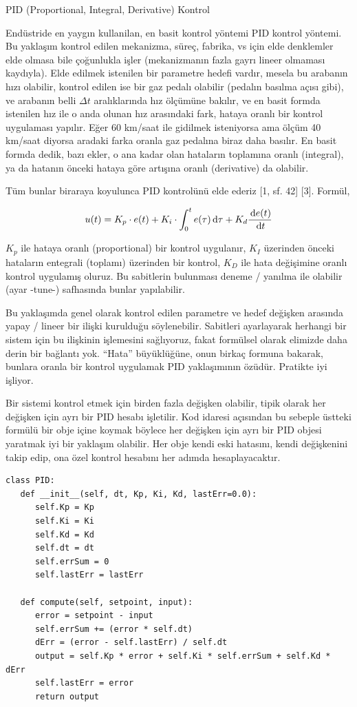\documentclass[12pt,fleqn]{article}\usepackage{../../common}
\begin{document}
PID (Proportional, Integral, Derivative) Kontrol

Endüstride en yaygın kullanilan, en basit kontrol yöntemi PID kontrol
yöntemi. Bu yaklaşım kontrol edilen mekanizma, süreç, fabrika, vs için elde
denklemler elde olmasa bile çoğunlukla işler (mekanizmanın fazla gayrı
lineer olmaması kaydıyla). Elde edilmek istenilen bir parametre hedefi
vardır, mesela bu arabanın hızı olabilir, kontrol edilen ise bir gaz pedalı
olabilir (pedalın basılma açısı gibi), ve arabanın belli $\Delta t$
aralıklarında hız ölçümüne bakılır, ve en basit formda istenilen hız ile o
anda olunan hız arasındaki fark, hataya oranlı bir kontrol uygulaması
yapılır. Eğer 60 km/saat ile gidilmek isteniyorsa ama ölçüm 40 km/saat
diyorsa aradaki farka oranla gaz pedalına biraz daha basılır. En basit
formda dedik, bazı ekler, o ana kadar olan hataların toplamına oranlı
(integral), ya da hatanın önceki hataya göre artışına oranlı (derivative)
da olabilir.

Tüm bunlar biraraya koyulunca PID kontrolünü elde ederiz [1, sf. 42] [3]. Formül,

$$
u(t) = 
K_p \cdot e(t) + 
K_i \cdot \int_0^t e(\tau) \,\mathrm{d} \tau + 
K_d \frac{\,\mathrm{d} e(t)}{\,\mathrm{d} t}
$$

$K_p$ ile hataya oranlı (proportional) bir kontrol uygulanır, $K_I$
üzerinden önceki hataların entegrali (toplamı) üzerinden bir kontrol, $K_D$
ile hata değişimine oranlı kontrol uygulamış oluruz. Bu sabitlerin
bulunması deneme / yanılma ile olabilir (ayar -tune-) safhasında bunlar
yapılabilir.

Bu yaklaşımda genel olarak kontrol edilen parametre ve hedef değişken
arasında yapay / lineer bir ilişki kurulduğu söylenebilir. Sabitleri
ayarlayarak herhangi bir sistem için bu ilişkinin işlemesini sağlıyoruz,
fakat formülsel olarak elimizde daha derin bir bağlantı yok. ``Hata''
büyüklüğüne, onun birkaç formuna bakarak, bunlara oranla bir kontrol
uygulamak PID yaklaşımının özüdür. Pratikte iyi işliyor.

Bir sistemi kontrol etmek için birden fazla değişken olabilir, tipik olarak
her değişken için ayrı bir PID hesabı işletilir. Kod idaresi açısından bu
sebeple üstteki formülü bir obje içine koymak böylece her değişken için
ayrı bir PID objesi yaratmak iyi bir yaklaşım olabilir. Her obje kendi eski
hatasını, kendi değişkenini takip edip, ona özel kontrol hesabını her
adımda hesaplayacaktır.

\begin{verbatim}
class PID:
   def __init__(self, dt, Kp, Ki, Kd, lastErr=0.0):
      self.Kp = Kp
      self.Ki = Ki
      self.Kd = Kd
      self.dt = dt
      self.errSum = 0
      self.lastErr = lastErr

   def compute(self, setpoint, input):
      error = setpoint - input
      self.errSum += (error * self.dt)
      dErr = (error - self.lastErr) / self.dt
      output = self.Kp * error + self.Ki * self.errSum + self.Kd * dErr
      self.lastErr = error
      return output

\end{verbatim}
\end{document}
